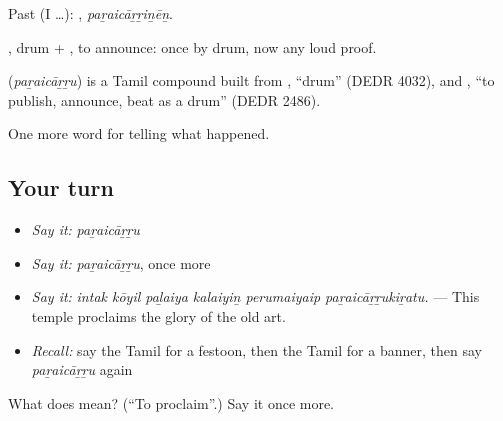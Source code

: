 Past (I …): , \emph{paṟaicāṟṟiṉēṉ}.

, drum + , to announce: once by drum, now any loud proof.

\begin{cousinweb}
\textbf{} (\emph{paṟaicāṟṟu}) is a Tamil compound built from , \textquotedblleft{}drum\textquotedblright{} (DEDR 4032), and , \textquotedblleft{}to publish, announce, beat as a drum\textquotedblright{} (DEDR 2486).
\end{cousinweb}

\begin{grammarlens}[title={What you've built}]
One more word for telling what happened.
\end{grammarlens}

\subsection*{Your turn}
\begin{itemize}
\raggedright
  \item \emph{Say it:} \emph{paṟaicāṟṟu}
  \item \emph{Say it:} \emph{paṟaicāṟṟu}, once more
  \item \emph{Say it:} \emph{intak kōyil paḻaiya kalaiyiṉ perumaiyaip paṟaicāṟṟukiṟatu.} — This temple proclaims the glory of the old art.
  \item \emph{Recall:} say the Tamil for a festoon, then the Tamil for a banner, then say \emph{paṟaicāṟṟu} again
\end{itemize}

\begin{tcolorbox}[breakable,colback=teal!4,colframe=teal!35!black,title={Before you move on}]
What does  mean? (\textquotedblleft{}To proclaim\textquotedblright{}.) Say it once more.
\end{tcolorbox}
